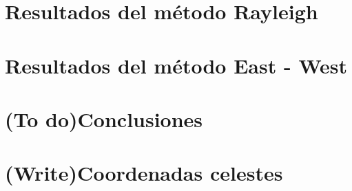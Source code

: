 \documentclass[12pt,papel,twoside,pagebackref]{ibtesis}
\begin{document}
\chapter{Resultados del método Rayleigh}
	\graphicspath{{../Dipole_1-2_EeVReport/}}
	


\chapter{Resultados del método East - West}
	\graphicspath{{../EW/}}	
	

\chapter{(To do)Conclusiones}
	

\appendix
	\chapter{(Write)Coordenadas celestes}
	

\begin{biblio}
	
\end{biblio}
\end{document}

